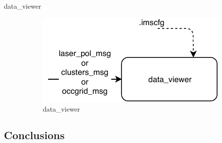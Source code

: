 \begin{description}
\item[data\_viewer] \hfill
\begin{figure}[ht!]
\centering
\includegraphics[scale=1]{fig/3/data_viewer.pdf}
\caption{data\_viewer}
\label{data_viewer}
\end{figure}

\end{description}

\subsection{Conclusions}